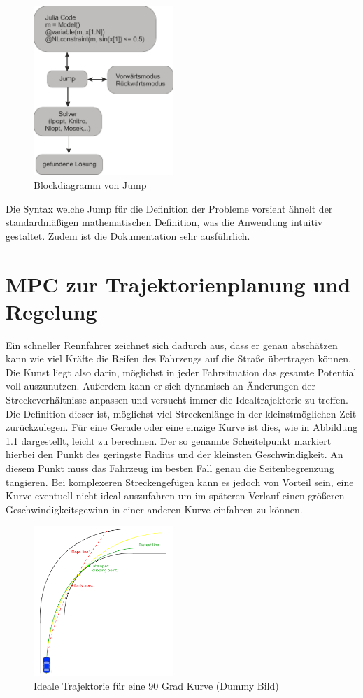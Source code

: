 \documentclass{like}
\begin{document}
\begin{figure}[ht!]
	\centering
	\includegraphics[width=150pt]{Abbildungen/jumpDiagram.png}
	\caption{Blockdiagramm von Jump}
	\label{fig:jumpDiagram}
\end{figure}

Die Syntax welche Jump für die Definition der Probleme vorsieht ähnelt der standardmäßigen mathematischen Definition, was die Anwendung intuitiv gestaltet. Zudem ist die Dokumentation sehr ausführlich.


\chapter{MPC zur Trajektorienplanung und Regelung}

Ein schneller Rennfahrer zeichnet sich dadurch aus, dass er genau abschätzen kann wie viel Kräfte die Reifen des Fahrzeugs auf die Straße übertragen können. Die Kunst liegt also darin, möglichst in jeder Fahrsituation das gesamte Potential voll auszunutzen. Außerdem kann er sich dynamisch an Änderungen der Streckeverhältnisse anpassen und versucht immer die Idealtrajektorie zu treffen. Die Definition dieser ist, möglichst viel Streckenlänge in der kleinstmöglichen Zeit zurückzulegen. Für eine Gerade oder eine einzige Kurve ist dies, wie in Abbildung \ref{fig:idealTrajektorie} dargestellt, leicht zu berechnen. Der so genannte Scheitelpunkt markiert hierbei den Punkt des geringste Radius und der kleinsten Geschwindigkeit. An diesem Punkt muss das Fahrzeug im besten Fall genau die Seitenbegrenzung tangieren. 
Bei komplexeren Streckengefügen kann es jedoch von Vorteil sein, eine Kurve eventuell nicht ideal auszufahren um im späteren Verlauf einen größeren Geschwindigkeitsgewinn in einer anderen Kurve einfahren zu können.

\begin{figure}[ht!]
	\centering
	\includegraphics[width=150pt]{Abbildungen/idealTrajektorie.png}
	\caption{Ideale Trajektorie für eine 90 Grad Kurve (Dummy Bild)}
	\label{fig:idealTrajektorie}
\end{figure}
\end{document}
